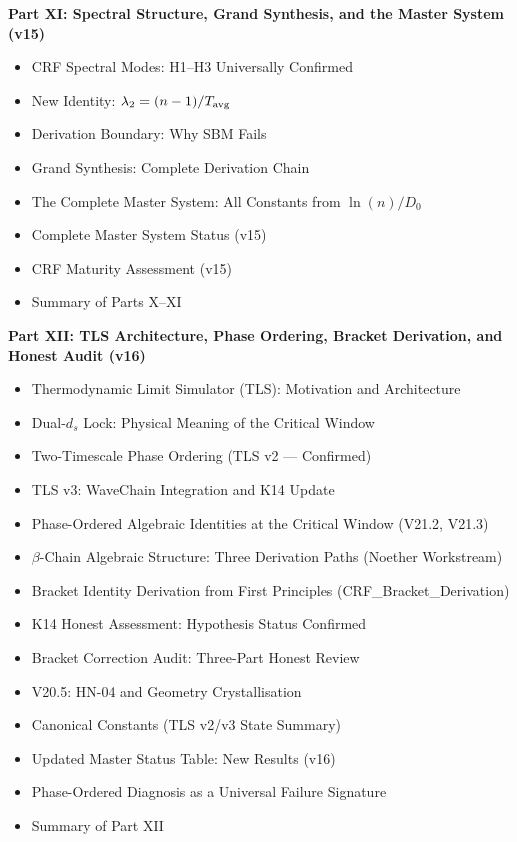 \documentclass[11pt, a4paper]{article}
\begin{document}
\begin{contentsbox}[title={Part B --- Part and Section Headers}]
\textbf{Part XI: Spectral Structure, Grand Synthesis, and the Master System (v15)}
\begin{itemize}[noitemsep,leftmargin=1.5em]
  \item CRF Spectral Modes: H1--H3 Universally Confirmed
  \item New Identity: $\lambda_2 = (n-1)/T_{\rm avg}$
  \item Derivation Boundary: Why SBM Fails
  \item Grand Synthesis: Complete Derivation Chain
  \item The Complete Master System: All Constants from $\ln(n)/D_0$
  \item Complete Master System Status (v15)
  \item CRF Maturity Assessment (v15)
  \item Summary of Parts X--XI
\end{itemize}

\textbf{Part XII: TLS Architecture, Phase Ordering, Bracket Derivation, and Honest Audit (v16)}
\begin{itemize}[noitemsep,leftmargin=1.5em]
  \item Thermodynamic Limit Simulator (TLS): Motivation and Architecture
  \item Dual-$d_s$ Lock: Physical Meaning of the Critical Window
  \item Two-Timescale Phase Ordering (TLS v2 --- Confirmed)
  \item TLS v3: WaveChain Integration and K14 Update
  \item Phase-Ordered Algebraic Identities at the Critical Window (V21.2, V21.3)
  \item $\beta$-Chain Algebraic Structure: Three Derivation Paths (Noether Workstream)
  \item Bracket Identity Derivation from First Principles (CRF\_Bracket\_Derivation)
  \item K14 Honest Assessment: Hypothesis Status Confirmed
  \item Bracket Correction Audit: Three-Part Honest Review
  \item V20.5: HN-04 and Geometry Crystallisation
  \item Canonical Constants (TLS v2/v3 State Summary)
  \item Updated Master Status Table: New Results (v16)
  \item Phase-Ordered Diagnosis as a Universal Failure Signature
  \item Summary of Part XII
\end{itemize}


\end{contentsbox}
\end{document}
